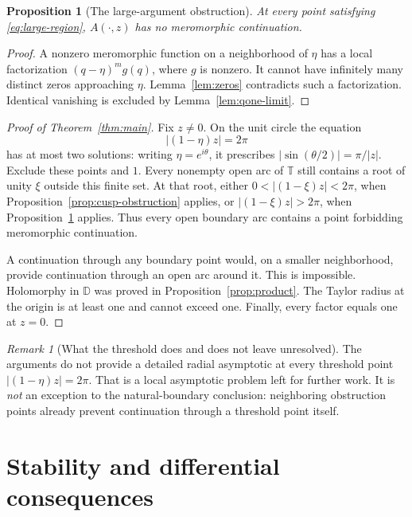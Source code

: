 \documentclass[11pt,a4paper]{article}
\numberwithin{equation}{section}
\newtheorem{proposition}[theorem]{Proposition}
\theoremstyle{definition}
\theoremstyle{remark}
\newtheorem{remark}[theorem]{Remark}
\newcommand{\D}{\mathbb D}
\newcommand{\T}{\mathbb T}
\begin{document}
\begin{proposition}[The large-argument obstruction]\label{prop:zero-obstruction}
At every point satisfying \eqref{eq:large-region}, \(A(\cdot,z)\) has no meromorphic continuation.
\end{proposition}
\begin{proof}
A nonzero meromorphic function on a neighborhood of \(\eta\) has a local factorization \((q-\eta)^m g(q)\), where \(g\) is nonzero. It cannot have infinitely many distinct zeros approaching \(\eta\). Lemma~\ref{lem:zeros} contradicts such a factorization. Identical vanishing is excluded by Lemma~\ref{lem:qone-limit}.
\end{proof}

\begin{proof}[Proof of Theorem~\ref{thm:main}]
Fix \(z\ne0\). On the unit circle the equation
\[
 |(1-\eta)z|=2\pi
\]
has at most two solutions: writing \(\eta=e^{i\theta}\), it prescribes \(|\sin(\theta/2)|=\pi/|z|\). Exclude these points and \(1\). Every nonempty open arc of \(\T\) still contains a root of unity \(\xi\) outside this finite set. At that root, either \(0<|(1-\xi)z|<2\pi\), when Proposition~\ref{prop:cusp-obstruction} applies, or \(|(1-\xi)z|>2\pi\), when Proposition~\ref{prop:zero-obstruction} applies. Thus every open boundary arc contains a point forbidding meromorphic continuation.

A continuation through any boundary point would, on a smaller neighborhood, provide continuation through an open arc around it. This is impossible. Holomorphy in \(\D\) was proved in Proposition~\ref{prop:product}. The Taylor radius at the origin is at least one and cannot exceed one. Finally, every factor equals one at \(z=0\).
\end{proof}

\begin{remark}[What the threshold does and does not leave unresolved]
The arguments do not provide a detailed radial asymptotic at every threshold point \(|(1-\eta)z|=2\pi\). That is a local asymptotic problem left for further work. It is \emph{not} an exception to the natural-boundary conclusion: neighboring obstruction points already prevent continuation through a threshold point itself.
\end{remark}

\section{Stability and differential consequences}
\end{document}
